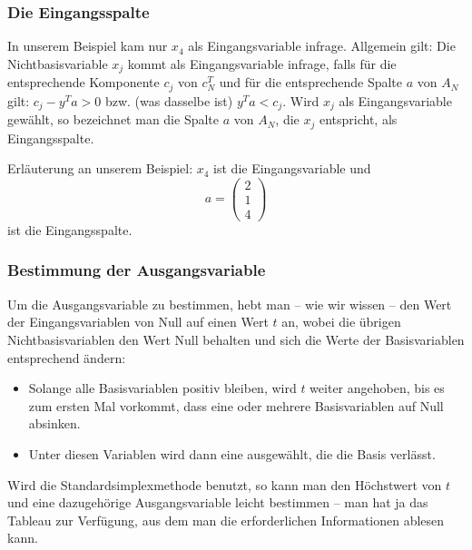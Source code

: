 \documentclass[smaller]{beamer}
\begin{document}
\begin{frame}
 \frametitle{Die Eingangsspalte}
 In unserem Beispiel kam nur $x_4$ als Eingangsvariable infrage. Allgemein gilt: Die Nichtbasisvariable $x_j$ kommt als Eingangsvariable infrage, falls für die entsprechende Komponente $c_j$ von $c_N^T$ und für die entsprechende Spalte $a$ von $A_N$ gilt: $c_j-y^Ta > 0$ bzw. (was dasselbe ist) $y^Ta < c_j$. Wird $x_j$ als Eingangsvariable gewählt, so bezeichnet man die Spalte $a$ von $A_N$, die $x_j$ entspricht, als \alert{Eingangsspalte}.\\ \vspace*{0.2cm}
 
Erläuterung an unserem Beispiel: $x_4$ ist die Eingangsvariable und
\[
a = \begin{pmatrix} 2 \\ 1 \\ 4 \end{pmatrix}
\]
ist die Eingangsspalte.
\end{frame}

\begin{frame}
 \frametitle{Bestimmung der Ausgangsvariable}
 Um die \alert{Ausgangsvariable} zu bestimmen, hebt man -- wie wir wissen -- den Wert der Eingangsvariablen von Null auf einen Wert $t$ an, wobei die übrigen Nichtbasisvariablen den Wert Null behalten und sich die Werte der Basisvariablen entsprechend ändern:
 \begin{itemize}
   \item Solange alle Basisvariablen positiv bleiben, wird $t$ weiter angehoben, bis es zum ersten Mal vorkommt, dass eine oder mehrere Basisvariablen auf Null absinken. 
   \item Unter diesen Variablen wird dann eine ausgewählt, die die Basis verlässt.
 \end{itemize}

Wird die \alert{Standardsimplexmethode} benutzt, so kann man den Höchstwert von $t$ und eine dazugehörige Ausgangsvariable leicht bestimmen -- man hat ja das Tableau zur Verfügung, aus dem man die erforderlichen Informationen ablesen kann.
\end{frame}
\end{document}
